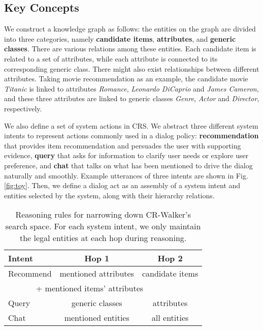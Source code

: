 \documentclass[11pt]{article}
\begin{document}
\subsection{Key Concepts}\label{sec:concept}
We construct a knowledge graph  as follows: the entities  on the graph are divided into three categories, namely \textbf{candidate items}, \textbf{attributes}, and \textbf{generic classes}. There are various relations  among these entities. Each candidate item is related to a set of attributes, while each attribute is connected to its corresponding generic class. There might also exist relationships between different attributes. Taking movie recommendation as an example, the candidate movie \textit{Titanic} is linked to attributes \textit{Romance}, \textit{Leonardo DiCaprio} and \textit{James Cameron}, and these three attributes are linked to generic classes \textit{Genre}, \textit{Actor} and \textit{Director}, respectively. 


We also define a set of system actions in CRS. We abstract three different system intents to represent actions commonly used in a dialog policy: \textbf{recommendation} that provides item recommendation and persuades the user with supporting evidence, \textbf{query} that asks for information to clarify user needs or explore user preference, and \textbf{chat} that talks on what has been mentioned to drive the dialog naturally and smoothly. Example utterances of three intents are shown in Fig. \ref{fig:toy}. Then, we define a dialog act  as an assembly of a system intent and entities selected by the system, along with their hierarchy relations.

\begin{table}[htb]
    \centering
    \small
    \begin{tabular}{lcc}
    \toprule
        Intent & Hop 1 & Hop 2 \\
    \midrule
        Recommend & mentioned attributes & candidate items \\
        \multicolumn{3}{c}{+ mentioned items' attributes ~~~~~~} \\
        \cmidrule(lr){1-3}
        Query & generic classes & attributes\\
        \cmidrule(lr){1-3}
        Chat & mentioned entities & all entities\\
    \bottomrule
    \end{tabular}
    \caption{Reasoning rules for narrowing down CR-Walker's search space. For each system intent, we only maintain the legal entities at each hop during reasoning.}
    \label{tab:reasoning}
\end{table}
\end{document}
